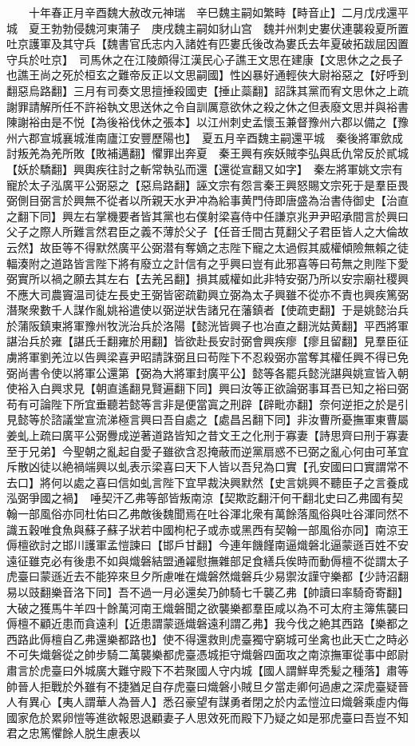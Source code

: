 　　十年春正月辛酉魏大赦改元神瑞　辛巳魏主嗣如繁畤【畤音止】二月戊戌還平城　夏王勃勃侵魏河東蒲子　庚戌魏主嗣如豺山宫　魏并州刺史婁伏連襲殺夏所置吐京護軍及其守兵【魏書官氏志内入諸姓有匹婁氏後改為婁氏去年夏破拓跋屈因置守兵於吐京】　司馬休之在江陵頗得江漢民心子譙王文思在建康【文思休之之長子也譙王尚之死於桓玄之難帝反正以文思嗣國】性凶暴好通輕俠大尉裕惡之【好呼到翻惡烏路翻】三月有司奏文思擅捶殺國吏【捶止蘂翻】詔誅其黨而宥文思休之上疏謝罪請解所任不許裕執文思送休之令自訓厲意欲休之殺之休之但表廢文思并與裕書陳謝裕由是不悦【為後裕伐休之張本】以江州刺史孟懷玉兼督豫州六郡以備之【豫州六郡宣城襄城淮南廬江安豐歷陽也】　夏五月辛酉魏主嗣還平城　秦後將軍歛成討叛羌為羌所敗【敗補邁翻】懼罪出奔夏　秦王興有疾妖賊李弘與氐仇常反於貳城【妖於驕翻】興輿疾往討之斬常執弘而還【還從宣翻又如字】　秦左將軍姚文宗有寵於太子泓廣平公弼惡之【惡烏路翻】誣文宗有怨言秦王興怒賜文宗死于是羣臣畏弼側目弼言於興無不從者以所親天水尹冲為給事黄門侍即唐盛為治書侍御史【治直之翻下同】興左右掌機要者皆其黨也右僕射梁喜侍中任謙京兆尹尹昭承間言於興曰父子之際人所難言然君臣之義不薄於父子【任音壬間古莧翻父子君臣皆人之大倫故云然】故臣等不得默然廣平公弼潜有奪嫡之志陛下寵之太過假其威權傾險無賴之徒輻湊附之道路皆言陛下將有廢立之計信有之乎興曰豈有此邪喜等曰苟無之則陛下愛弼實所以禍之願去其左右【去羌呂翻】損其威權如此非特安弼乃所以安宗廟社稷興不應大司農竇温司徒左長史王弼皆密疏勸興立弼為太子興雖不從亦不責也興疾篤弼潛聚衆數千人謀作亂姚裕遣使以弼逆狀吿諸兄在藩鎮者【使疏吏翻】于是姚懿治兵於蒲阪鎮東將軍豫州牧洸治兵於洛陽【懿洸皆興子也冶直之翻洸姑黄翻】平西將軍諶治兵於雍【諶氏壬翻雍於用翻】皆欲赴長安討弼會興疾瘳【瘳且留翻】見羣臣征虜將軍劉羌泣以告興梁喜尹昭請誅弼且曰苟陛下不忍殺弼亦當奪其權任興不得已免弼尚書令使以將軍公還第【弼為大將軍封廣平公】懿等各罷兵懿洸諶與姚宣皆入朝使裕入白興求見【朝直遙翻見賢遍翻下同】興曰汝等正欲論弼事耳吾已知之裕曰弼苟有可論陛下所宜垂聽若懿等言非是便當寘之刑辟【辟毗亦翻】奈何逆拒之於是引見懿等於諮議堂宣流涕極言興曰吾自處之【處昌呂翻下同】非汝曹所憂撫軍東曹屬姜虬上疏曰廣平公弼釁成逆著道路皆知之昔文王之化刑于寡妻【詩思齊曰刑于寡妻至于兄弟】今聖朝之亂起自愛子雖欲含忍掩蔽而逆黨扇惑不已弼之亂心何由可革宜斥散凶徒以絶禍端興以虬表示梁喜曰天下人皆以吾兒為口實【孔安國曰口實謂常不去口】將何以處之喜曰信如虬言陛下宜早裁決興默然【史言姚興不聽臣子之言養成泓弼爭國之禍】　唾契汗乙弗等部皆叛南涼【契欺訖翻汗何干翻北史曰乙弗國有契翰一部風俗亦同杜佑曰乙弗敵後魏聞焉在吐谷渾北衆有萬餘落風俗與吐谷渾同然不識五穀唯食魚與蘇子蘇子狀若中國枸杞子或赤或黑西有契翰一部風俗亦同】南涼王傉檀欲討之邯川護軍孟愷諫曰【邯戶甘翻】今連年饑饉南逼熾磐北逼蒙遜百姓不安遠征雖克必有後患不如與熾磐結盟通糴慰撫雜部足食繕兵俟時而動傉檀不從謂太子虎臺曰蒙遜近去不能猝來旦夕所慮唯在熾磐然熾磐兵少易禦汝謹守樂都【少詩沼翻易以豉翻樂音洛下同】吾不過一月必還矣乃帥騎七千襲乙弗【帥讀曰率騎奇寄翻】大破之獲馬牛羊四十餘萬河南王熾磐聞之欲襲樂都羣臣咸以為不可太府主簿焦襲曰傉檀不顧近患而貪遠利【近患謂蒙遜熾磐遠利謂乙弗】我今伐之絶其西路【樂都之西路此傉檀自乙弗還樂都路也】使不得還救則虎臺獨守窮城可坐禽也此天亡之時必不可失熾磐從之帥步騎二萬襲樂都虎臺憑城拒守熾磐四面攻之南涼撫軍從事中郎尉肅言於虎臺曰外城廣大難守殿下不若聚國人守内城【國人謂鮮卑秃髪之種落】肅等帥晉人拒戰於外雖有不捷猶足自存虎臺曰熾磐小賊旦夕當走卿何過慮之深虎臺疑晉人有異心【夷人謂華人為晉人】悉召豪望有謀勇者閉之於内孟愷泣曰熾磐乘虛内侮國家危於累卵愷等進欲報恩退顧妻子人思效死而殿下乃疑之如是邪虎臺曰吾豈不知君之忠篤懼餘人脱生慮表以